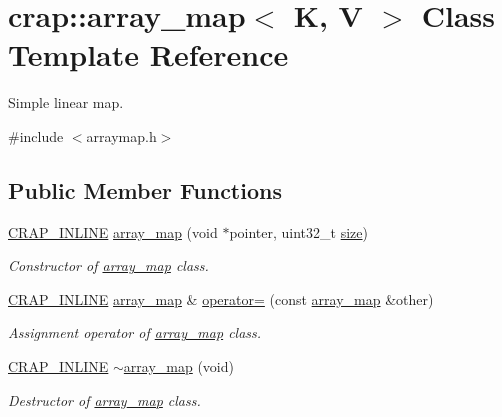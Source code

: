 \hypertarget{classcrap_1_1array__map}{\section{crap\+:\+:array\+\_\+map$<$ K, V $>$ Class Template Reference}
\label{classcrap_1_1array__map}
}


Simple linear map.  




{\ttfamily \#include $<$arraymap.\+h$>$}

\subsection*{Public Member Functions}
\begin{DoxyCompactItemize}
\item 
\hyperlink{config__x86_8h_a5a40526b8d842e7ff731509998bb0f1c}{C\+R\+A\+P\+\_\+\+I\+N\+L\+I\+N\+E} \hyperlink{classcrap_1_1array__map_ad8452f8a9a16d043796b5348a7865801}{array\+\_\+map} (void $\ast$pointer, uint32\+\_\+t \hyperlink{classcrap_1_1array__map_a3cabf7c30b1e7d29a8d0e4addbcf6f11}{size})
\begin{DoxyCompactList}\small\item\em Constructor of \hyperlink{classcrap_1_1array__map}{array\+\_\+map} class. \end{DoxyCompactList}\item 
\hyperlink{config__x86_8h_a5a40526b8d842e7ff731509998bb0f1c}{C\+R\+A\+P\+\_\+\+I\+N\+L\+I\+N\+E} \hyperlink{classcrap_1_1array__map}{array\+\_\+map} \& \hyperlink{classcrap_1_1array__map_ad6c30d315809f4ab2a7a3333a060bd74}{operator=} (const \hyperlink{classcrap_1_1array__map}{array\+\_\+map} \&other)
\begin{DoxyCompactList}\small\item\em Assignment operator of \hyperlink{classcrap_1_1array__map}{array\+\_\+map} class. \end{DoxyCompactList}\item 
\hyperlink{config__x86_8h_a5a40526b8d842e7ff731509998bb0f1c}{C\+R\+A\+P\+\_\+\+I\+N\+L\+I\+N\+E} \hyperlink{classcrap_1_1array__map_aa34a83de1d308d255269d160f5a0929e}{$\sim$array\+\_\+map} (void)
\begin{DoxyCompactList}\small\item\em Destructor of \hyperlink{classcrap_1_1array__map}{array\+\_\+map} class. \end{DoxyCompactList}\item 

\end{DoxyCompactItemize}
